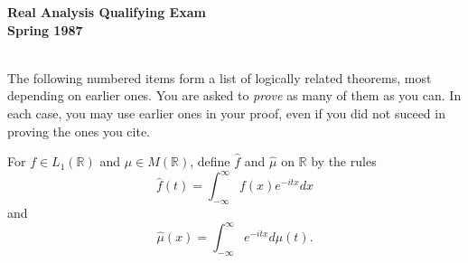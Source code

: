 \documentclass{article}
\def\R{\mathbb R}
\begin{document}






\begin{center}\begin{LARGE}
{\bf  Real Analysis Qualifying Exam}\\ 
{\bf Spring 1987}\\ \end{LARGE}
\end{center}
\vspace{0.1in}
\noindent\hrulefill\\

The following numbered items form a list of logically related theorems,
most depending on earlier ones. You are asked to {\it prove} as many of
them as you can. In each case, you may use earlier ones in your proof, even
if you did not suceed in proving the ones you cite.

For $f \in L_1(\R)$ and $\mu \in M(\R)$, define $\widehat f$ and
$\widehat \mu$ on $\R$ by the rules
$$\widehat f(t) = \int^\infty_{-\infty} f(x) e^{-itx} dx$$
and
$$\widehat \mu(x) = \int^\infty_{-\infty} e^{-itx} d \mu (t).$$
\end{document}
